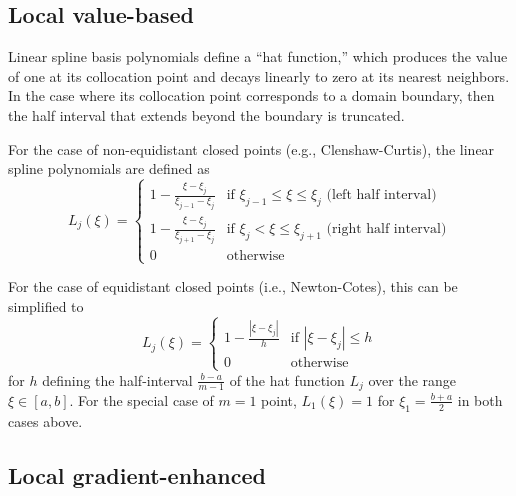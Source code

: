 \subsection{Local value-based} \label{uq:expansion:interp:linear}

Linear spline basis polynomials define a ``hat function,'' 
which produces the value of one at its collocation point and decays 
linearly to zero at its nearest neighbors.  In the case where its
collocation point corresponds to a domain boundary, then the half
interval that extends beyond the boundary is truncated.

For the case of non-equidistant closed points (e.g., Clenshaw-Curtis),
the linear spline polynomials are defined as
\begin{equation}
L_j(\xi) = 
\begin{cases}
1 - \frac{\xi - \xi_j}{\xi_{j-1} - \xi_j} & 
\text{if $\xi_{j-1} \leq \xi \leq \xi_j$ (left half interval)}\\
1 - \frac{\xi - \xi_j}{\xi_{j+1} - \xi_j} & 
\text{if $\xi_j < \xi \leq \xi_{j+1}$ (right half interval)}\\
0 & \text{otherwise}
\end{cases}
\end{equation}

For the case of equidistant closed points (i.e., Newton-Cotes), this
can be simplified to
\begin{equation}
L_j(\xi) = 
\begin{cases}
1 - \frac{|\xi - \xi_j|}{h} & \text{if $|\xi - \xi_j| \leq h$}\\
0                           & \text{otherwise}
\end{cases}
\end{equation}
for $h$ defining the half-interval $\frac{b - a}{m - 1}$ of the hat
function $L_j$ over the range $\xi \in [a, b]$.  For the special case
of $m = 1$ point, $L_1(\xi) = 1$ for $\xi_1 = \frac{b+a}{2}$ in both 
cases above.

\subsection{Local gradient-enhanced} \label{uq:expansion:interp:cubic}

